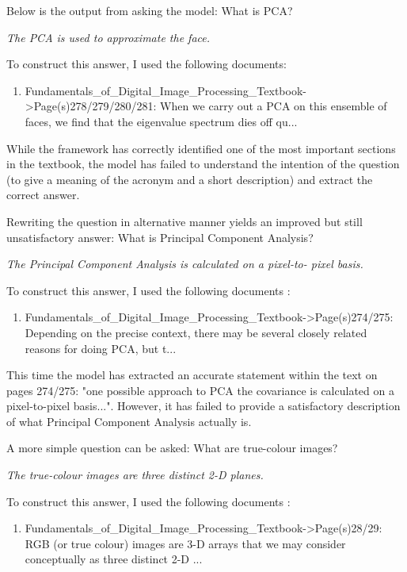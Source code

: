 \documentclass{article}
\newenvironment{itquote}
  {\begin{displayquote}\itshape}
  {\end{displayquote}\ignorespacesafterend}
\begin{document}
Below is the output from asking the model: What is PCA?
\begin{itquote}
    The PCA is used to approximate the face.
    
    To construct this answer, I used the following documents: 
    \begin{enumerate}
        \item Fundamentals\_of\_Digital\_Image\_Processing\_Textbook->Page(s)278/279/280/281:
    When we carry out a PCA on this ensemble of faces, we find that the eigenvalue spectrum
    dies off qu...
    \end{enumerate}
\end{itquote}

While the framework has correctly identified one of the most important sections in the textbook, the model has failed to understand the intention of the question (to give a meaning of the acronym and a short description) and extract the correct answer.

Rewriting the question in alternative manner yields an improved but still unsatisfactory answer: What is Principal Component Analysis?
\begin{itquote}
    The Principal Component Analysis is calculated on a pixel-to- pixel basis.
    
    To construct this answer, I used the following documents : 
    \begin{enumerate}
        \item Fundamentals\_of\_Digital\_Image\_Processing\_Textbook->Page(s)274/275:
    Depending on the precise context, there may be several closely related reasons for doing
    PCA, but t...
    \end{enumerate}
\end{itquote}

This time the model has extracted an accurate statement within the text on pages 274/275: "one possible approach to PCA the covariance is calculated on a pixel-to-pixel basis...". However, it has failed to provide a satisfactory description of what Principal Component Analysis actually is.

A more simple question can be asked: What are true-colour images?
\begin{itquote}
    The true-colour images are three distinct 2-D planes.

    To construct this answer, I used the following documents : 
    \begin{enumerate}
        \item Fundamentals\_of\_Digital\_Image\_Processing\_Textbook->Page(s)28/29:
RGB (or true colour) images are 3-D arrays that we may consider conceptually as three
distinct 2-D ...
    \end{enumerate}
\end{itquote}
\end{document}
